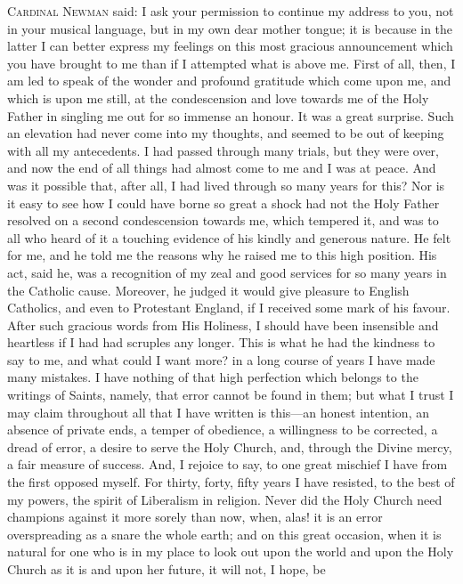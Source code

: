 C\textsc{ardinal} N\textsc{ewman}
said: I ask your permission to continue my address to you, not in your
musical language, but in my own dear mother tongue; it is because in
the latter I can better express my feelings on this most gracious
announcement which you have brought to me than if I attempted what is
above me. First of all, then, I am led to speak of the wonder and
profound gratitude which come upon me, and which is upon me still, at
the condescension and love towards me of the Holy Father in singling
me out for so immense an honour. It was a great surprise. Such an
elevation had never come into my thoughts, and seemed to be out
of keeping with all my antecedents. I had passed through many trials,
but they were over, and now the end of all things had almost come to
me and I was at peace. And was it possible that, after all, I had
lived through so many years for this? Nor is it easy to see how I
could have borne so great a shock had not the Holy Father resolved on
a second condescension towards me, which tempered it, and was to all
who heard of it a touching evidence of his kindly and generous nature.
He felt for me, and he told me the reasons why he raised me to this
high position. His act, said he, was a recognition of my zeal and good
services for so many years in the Catholic cause. Moreover, he judged
it would give pleasure to English Catholics, and even to Protestant
England, if I received some mark of his favour. After such gracious
words from His Holiness, I should have been insensible and heartless
if I had had scruples any longer. This is what he had the kindness to
say to me, and what could I want more? in a long course of years I
have made many mistakes. I have nothing of that high perfection which
belongs to the writings of Saints, namely, that error cannot be found
in them; but what I trust I may claim throughout all that I have
written is this—an honest intention, an absence of private ends, a
temper of obedience, a willingness to be corrected, a dread of error,
a desire to serve the Holy Church, and, through the Divine mercy, a
fair measure of success. And, I rejoice to say, to one great mischief
I have from the first opposed myself. For thirty, forty, fifty years I
have resisted, to the best of my powers, the spirit of Liberalism in
religion. Never did the Holy Church need champions against it more
sorely than now, when, alas! it is an error overspreading as a snare
the whole earth; and on this great occasion, when it is natural for
one who is in my place to look out upon the world and upon the Holy
Church as it is and upon her future, it will not, I hope, be
